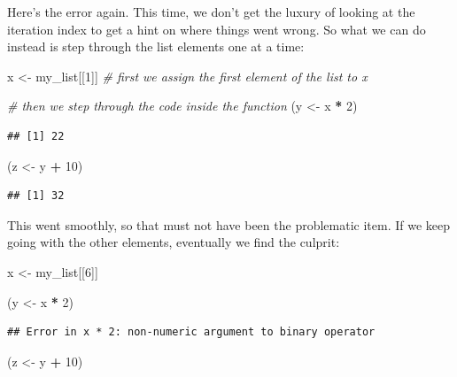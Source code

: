 \documentclass[
]{book}
\newenvironment{Shaded}{\begin{snugshade}}{\end{snugshade}}
\newcommand{\CommentTok}[1]{\textcolor[rgb]{0.56,0.35,0.01}{\textit{#1}}}
\newcommand{\DecValTok}[1]{\textcolor[rgb]{0.00,0.00,0.81}{#1}}
\newcommand{\NormalTok}[1]{#1}
\newcommand{\OtherTok}[1]{\textcolor[rgb]{0.56,0.35,0.01}{#1}}
\newcommand{\SpecialCharTok}[1]{\textcolor[rgb]{0.81,0.36,0.00}{\textbf{#1}}}
\begin{document}
Here's the error again. This time, we don't get the luxury of looking at the
iteration index to get a hint on where things went wrong. So what we can do
instead is step through the list elements one at a time:

\begin{Shaded}
\begin{Highlighting}[]
\NormalTok{x }\OtherTok{\textless{}{-}}\NormalTok{ my\_list[[}\DecValTok{1}\NormalTok{]] }\CommentTok{\# first we assign the first element of the list to x}

\CommentTok{\# then we step through the code inside the function}
\NormalTok{(y }\OtherTok{\textless{}{-}}\NormalTok{ x }\SpecialCharTok{*} \DecValTok{2}\NormalTok{)}
\end{Highlighting}
\end{Shaded}

\begin{verbatim}
## [1] 22
\end{verbatim}

\begin{Shaded}
\begin{Highlighting}[]
\NormalTok{(z }\OtherTok{\textless{}{-}}\NormalTok{ y }\SpecialCharTok{+} \DecValTok{10}\NormalTok{)}
\end{Highlighting}
\end{Shaded}

\begin{verbatim}
## [1] 32
\end{verbatim}

This went smoothly, so that must not have been the problematic item. If we keep
going with the other elements, eventually we find the culprit:

\begin{Shaded}
\begin{Highlighting}[]
\NormalTok{x }\OtherTok{\textless{}{-}}\NormalTok{ my\_list[[}\DecValTok{6}\NormalTok{]] }

\NormalTok{(y }\OtherTok{\textless{}{-}}\NormalTok{ x }\SpecialCharTok{*} \DecValTok{2}\NormalTok{)}
\end{Highlighting}
\end{Shaded}

\begin{verbatim}
## Error in x * 2: non-numeric argument to binary operator
\end{verbatim}

\begin{Shaded}
\begin{Highlighting}[]
\NormalTok{(z }\OtherTok{\textless{}{-}}\NormalTok{ y }\SpecialCharTok{+} \DecValTok{10}\NormalTok{)}
\end{Highlighting}
\end{Shaded}
\end{document}
